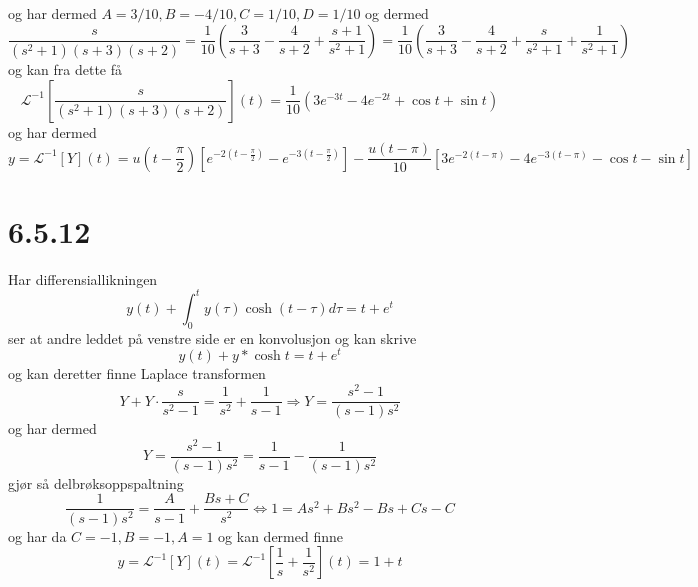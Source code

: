 \documentclass{report}
\newcommand{\nbrack}[1]{\left( #1 \right)}
\newcommand{\bbrack}[1]{\left[ #1 \right]}
\newcommand{\iLplc}[1]{\mathscr{L}^{-1}\bbrack{ #1 } (t)}
\begin{document}
og har dermed $A=3/10, B=-4/10, C=1/10, D=1/10$ og dermed
\begin{equation}
  \label{eq:10}
  \frac{s}{\nbrack{s^{2} + 1}(s+3)(s+2)} = \frac{1}{10}\nbrack{ \frac{3}{s+3} - \frac{4}{s+2} + \frac{s+1}{s^{2}+1}} = \frac{1}{10}\nbrack{ \frac{3}{s+3} - \frac{4}{s+2} + \frac{s}{s^{2}+1} + \frac{1}{s^{2}+1}}
\end{equation}
og kan fra dette få
\begin{equation}
  \label{eq:11}
  \iLplc{\frac{s}{\nbrack{s^{2} + 1}(s+3)(s+2)}} = \frac{1}{10}\nbrack{ 3e^{-3t} - 4e^{-2t} + \cos t + \sin t }
\end{equation}
og har dermed
\begin{equation}
  \label{eq:12}
  y = \iLplc{Y} = u\nbrack{ t-\frac{\pi}{2} } \bbrack{ e^{-2\nbrack{ t-\frac{\pi}{2} }} - e^{-3\nbrack{ t-\frac{\pi}{2} }} } - \frac{u\nbrack{t-\pi}}{10} \bbrack{ 3e^{-2(t-\pi)} - 4e^{-3(t-\pi)} - \cos t - \sin t }
\end{equation}



\section*{6.5.12}
Har differensiallikningen
\begin{equation}
  \label{eq:14}
  y(t) + \int_{0}^{t} y(\tau) \cosh (t-\tau) d\tau = t + e^{t}
\end{equation}
ser at andre leddet på venstre side er en konvolusjon og kan skrive
\begin{equation}
  \label{eq:15}
  y(t) + y*\cosh t = t + e^{t}
\end{equation}
og kan deretter finne Laplace transformen
\begin{equation}
  \label{eq:16}
  Y + Y\cdot \frac{s}{s^{2}-1} = \frac{1}{s^{2}} + \frac{1}{s-1} \Rightarrow Y = \frac{s^{2}-1}{(s-1)s^{2}}
\end{equation}
og har dermed
\begin{equation}
  \label{eq:17}
  Y = \frac{s^{2}-1}{(s-1)s^{2}} = \frac{1}{s-1} - \frac{1}{(s-1)s^{2}}
\end{equation}
gjør så delbrøksoppspaltning
\begin{equation}
  \label{eq:18}
  \frac{1}{(s-1)s^{2}} = \frac{A}{s-1} + \frac{Bs + C}{s^{2}} \Leftrightarrow 1 = As^{2} + Bs^{2} - Bs + Cs - C
\end{equation}
og har da $C=-1, B=-1, A=1$ og kan dermed finne
\begin{equation}
  \label{eq:19}
  y = \iLplc{Y} = \iLplc{\frac{1}{s} + \frac{1}{s^{2}}} = 1 + t
\end{equation}
\end{document}
